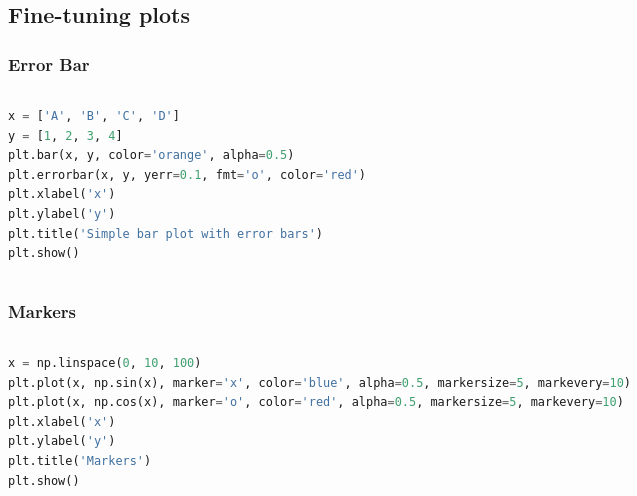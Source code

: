 \documentclass[beamer, en, version=2.0]{huangfusl-template}
\begin{document}
    \subsection{Fine-tuning plots}
    \begin{frame}[fragile]
        \frametitle{Error Bar}

        \begin{columns}
        \begin{column}{0.5\textwidth}
\begin{lstlisting}[language=python, breaklines]
x = ['A', 'B', 'C', 'D']
y = [1, 2, 3, 4]
plt.bar(x, y, color='orange', alpha=0.5)
plt.errorbar(x, y, yerr=0.1, fmt='o', color='red')
plt.xlabel('x')
plt.ylabel('y')
plt.title('Simple bar plot with error bars')
plt.show()
\end{lstlisting}
        \end{column}
        \begin{column}{0.5\textwidth}
            
        \end{column}
        \end{columns}
    \end{frame}
    \begin{frame}[fragile]
        \frametitle{Markers}

        \begin{columns}
        \begin{column}{0.5\textwidth}
\begin{lstlisting}[language=python, breaklines]
x = np.linspace(0, 10, 100)
plt.plot(x, np.sin(x), marker='x', color='blue', alpha=0.5, markersize=5, markevery=10)
plt.plot(x, np.cos(x), marker='o', color='red', alpha=0.5, markersize=5, markevery=10)
plt.xlabel('x')
plt.ylabel('y')
plt.title('Markers')
plt.show()
\end{lstlisting}
        \end{column}
        \begin{column}{0.5\textwidth}
            
        \end{column}
        \end{columns}
    \end{frame}
\end{document}

